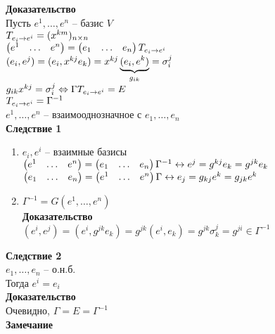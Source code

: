 \documentclass[12pt]{article}
\begin{document}
\textbf{Доказательство}\\
Пусть $e^1, \ldots, e^n$ -- базис $V$\\
$T_{e_i \rto e^i} = (x^{km})_{n\times n}$\\
$\begin{pmatrix}e^1 & \ldots & e^n\end{pmatrix} = \begin{pmatrix}e_1 & \ldots & e_n\end{pmatrix} T_{e_i\rto e^i}$\\
$(e_i, e^j) = (e_i, x^{kj} e_k) = x^{kj} \ub{g_{ik}}{(e_i, e^k)} = \sigma_i^j$\\
$g_{ik}x^{kj} = \sigma^j_i \LRto \Gamma T_{e_i \rto e^i} = E$\\
$T_{e_i \rto e^i} = \Gamma^{-1}$\\
$e^1,\ldots, e^n$ -- взаимооднозначное с $e_1,\ldots, e_n$\\
\textbf{Следствие 1}\\
\begin{enumerate}
    \item $e_i, e^i$ -- взаимные базисы\\
    $\begin{pmatrix}
        e^1 & \ldots & e^n
    \end{pmatrix} = \begin{pmatrix}
        e_1 & \ldots & e_n
    \end{pmatrix}\Gamma^{-1} \lrto e^j = g^{kj}e_k = g^{jk}e_k$\\
    $\begin{pmatrix}
        e_1 & \ldots & e_n
    \end{pmatrix} = \begin{pmatrix}
        e^1 & \ldots & e^n
    \end{pmatrix}\Gamma \lrto e_j = g_{kj}e^k = g_{jk}e^k$
    \item $\Gamma^{-1} = G(e^1, \ldots, e^n)$\\
    \textbf{Доказательство}\\
    $(e^i, e^j) = (e^i, g^{jk}e_k) = g^{jk}(e^i,e_k)=g^{jk}\sigma^j_k = g^{ji} \in \Gamma^{-1}$
\end{enumerate}
\textbf{Следствие 2}\\
$e_1, \ldots, e_n$ -- о.н.б.\\
Тогда $e^i = e_i$\\
\textbf{Доказательство}\\
Очевидно, $\Gamma = E = \Gamma^{-1}$\\
\textbf{Замечание}
\end{document}
